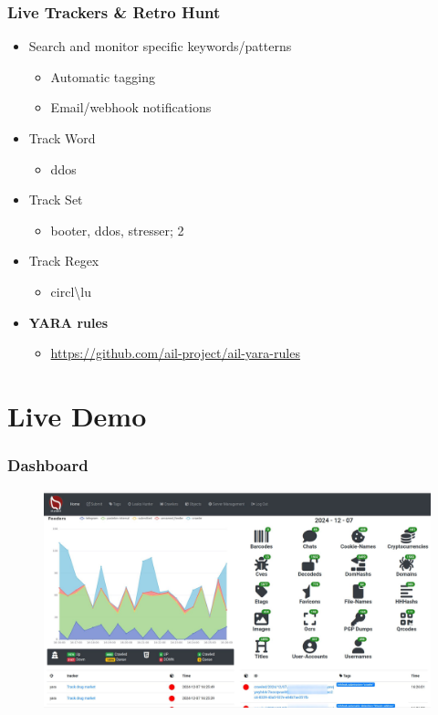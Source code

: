 \documentclass{beamer}
\begin{document}
\begin{frame}
	\frametitle{Live Trackers \& Retro Hunt}
    \begin{itemize}
        \item Search and monitor specific keywords/patterns
        \begin{itemize}
            \item Automatic tagging
            \item Email/webhook notifications
        \end{itemize}
        \item Track Word
        \begin{itemize}
            \item ddos
        \end{itemize}
        \item Track Set
        \begin{itemize}
            \item booter, ddos, stresser; 2
        \end{itemize}
        \item Track Regex
        \begin{itemize}
            \item circl\textbackslash lu
        \end{itemize}
        \item {\bf YARA rules}
        \begin{itemize}
            \item \url{https://github.com/ail-project/ail-yara-rules}
        \end{itemize}
    \end{itemize}
\end{frame}

\section{Live Demo}

\begin{frame}
    \frametitle{Dashboard}
    \begin{figure}
        \includegraphics[scale=0.16, angle=0]{screenshot/dashboard.jpeg}
    \end{figure}
\end{frame}
\end{document}
